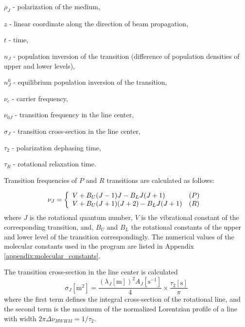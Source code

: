 \documentclass{report}
\begin{document}
$\rho_J$ - polarization of the medium,

$z$ - linear coordinate along the direction of beam propagation,

$t$ - time,

$n_J$ - population inversion of the transition (difference of population densities of upper and lower levels),

$n_J^0$ - equilibrium population inversion of the transition,

$\nu _c$ - carrier frequency,

$\nu_{0J}$ - transition frequency in the line center,

$\sigma_J$ - transition cross-section in the line center,

$\tau_2$ - polarization dephasing time,

$\tau_R$ - rotational relaxation time.

Transition frequencies of $P$ and $R$ transitions are calculated as follows:

\begin{equation}
\nu_J = \left\{ \begin{array}{ll}
  V + B_U (J-1)J     - B_L J (J+1) & (P)\\
  V + B_U (J+1)(J+2) - B_L J (J+1) & (R)\end{array}\right.\\ 
\end{equation}
where $J$ is the rotational quantum number, $V$ is the vibrational constant of the corresponding transition, and, $B_U$ and $B_L$ the rotational constants of the upper and lower level of the transition correspondingly. The numerical values of the molecular constants used in the program are listed in Appendix \ref{appendix:molecular_constants}.

The transition cross-section in the line center is calculated \cite{Hilborn-2002}
\begin{equation}
{\sigma _J}[\text{m}^2] = \frac{(\lambda _J[\text{m}])^2 A_J[\text{s}^{-1}]}{4} \times \frac{\tau_2[\text{s}]}{\pi}
\end{equation}
where the first term defines the integral cross-section of the rotational line, and the second term is the maximum of the normalized Lorentzian profile of a line with width $2\pi\Delta\nu _{HWHM}=1/\tau_2$.
\end{document}

